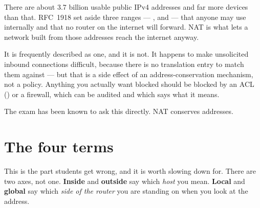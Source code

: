 There are about 3.7 billion usable public IPv4 addresses and far more devices
than that. RFC~1918 set aside three ranges --- ,
 and  --- that anyone may use internally
and that no router on the internet will forward. NAT is what lets a network built
from those addresses reach the internet anyway.

\begin{alertbox}
It is frequently described as one, and it is not. It happens to make unsolicited
inbound connections difficult, because there is no translation entry to match
them against --- but that is a side effect of an address-conservation mechanism,
not a policy. Anything you actually want blocked should be blocked by an ACL
() or a firewall, which can be audited and which says what it means.

The exam has been known to ask this directly. NAT conserves addresses.
\end{alertbox}

\section{The four terms}

This is the part students get wrong, and it is worth slowing down for. There are
two axes, not one. \textbf{Inside} and \textbf{outside} say which \emph{host} you
mean. \textbf{Local} and \textbf{global} say which \emph{side of the router} you
are standing on when you look at the address.

